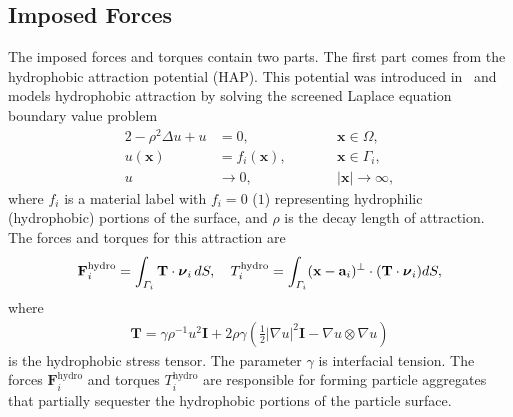 \documentclass[lineno]{jfm}
\renewcommand{\aa}{\mathbf{a}}
\newcommand{\FF}{\mathbf{F}}
\newcommand{\nnu}{\boldsymbol{\nu}}
\newcommand{\xx}{\mathbf{x}}
\begin{document}
\subsection{Imposed Forces}
The imposed forces and torques contain two parts. The first part comes
from the hydrophobic attraction potential (HAP). This potential was
introduced in~\cite{Fu20} and models hydrophobic attraction by solving
the screened Laplace equation boundary value problem
\begin{alignat}{2}
  \label{SL}
-\rho^2 \Delta u + u &=0,            && \xx \in \Omega,\\
\label{SLbc}
u(\xx) &= f_i(\xx),\qquad  && \xx \in \Gamma_i, \\
\label{SLff}
u &\to 0,                          &&|\xx| \to \infty,
\end{alignat}
where $f_i$ is a material label with $f_i = 0$ ($1$) representing
hydrophilic (hydrophobic) portions of the surface, and $\rho$ is the
decay length of attraction. The forces and torques for this attraction
are 
\begin{align}
  \label{eqn:hydrophobicAttraction}
  \FF_i^{\text{hydro}} = \int_{\Gamma_i} {\bf T}\cdot \nnu_i \, dS, 
    \quad 
  T_i^{\text{hydro}} = \int_{\Gamma_i} (\xx - \aa_i)^{\perp} \cdot ({\bf T} \cdot \nnu_i) dS,
\end{align}
where
\begin{align}
  \label{eq:stress}
\mathbf{T}
= \gamma\rho^{-1}u^2 \mathbf{I} + 2\rho\gamma \left(\tfrac{1}{2}|\nabla
  u|^2 \mathbf{I} - \nabla u\otimes \nabla u\right)
\end{align}
is the hydrophobic stress tensor. The parameter $\gamma$ is interfacial
tension. The forces $\FF_i^{\text{hydro}}$ and torques
$T_i^{\text{hydro}}$ are responsible for forming particle aggregates
that partially sequester the hydrophobic portions of the particle
surface.
\end{document}
